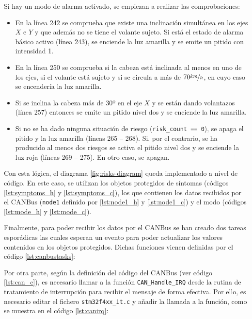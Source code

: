 Si hay un modo de alarma activado, se empiezan a realizar las comprobaciones:
\begin{itemize}
  \item En la línea 242 se comprueba que existe una inclinación simultánea en los ejes $X$
        e $Y$ y que además no se tiene el volante sujeto. Si está el estado de alarma
        básico activo (línea 243), se enciende la luz amarilla y se emite un pitido con
        intensidad 1.
  \item En la línea 250 se comprueba si la cabeza está inclinada al menos en uno de los ejes,
        si el volante está sujeto y si se circula a más de $70 \nicefrac{km}{h}$, en cuyo
        caso se encendería la luz amarilla.
  \item Si se inclina la cabeza más de 30º en el eje $X$ y se están dando volantazos (línea
        257) entonces se emite un pitido nivel dos y se enciende la luz amarilla.
  \item Si no se ha dado ninguna situación de riesgo (\texttt{risk\_count == 0}), se
        apaga el pitido y la luz amarilla (líneas 265 -- 268). Si, por el contrario, se
        ha producido al menos dos riesgos se activa el pitido nivel dos y se enciende
        la luz roja (líneas 269 -- 275). En otro caso, se apagan.
\end{itemize}

Con esta lógica, el diagrama \ref{fig:risks-diagram} queda implementado a nivel de código.
En este caso, se utilizan los objetos protegidos de síntomas (códigos \ref{lst:symptoms_h}
y \ref{lst:symptoms_c}), los que contienen los datos recibidos por el CANBus (\texttt{node1}
definido por \ref{lst:node1_h} y \ref{lst:node1_c}) y el modo (códigos \ref{lst:mode_h} y
\ref{lst:mode_c}).

Finalmente, para poder recibir los datos por el CANBus se han creado dos tareas esporádicas
las cuales esperan un evento para poder actualizar los valores contenidos en los objetos
protegidos. Dichas funciones vienen definidas por el código \ref{lst:canbustasks}:



Por otra parte, según la definición del código del CANBus (ver código \ref{lst:can_c}),
es necesario llamar a la función \texttt{CAN\_Handle\_IRQ} desde la rutina de 
tratamiento de interrupción para recibir el mensaje de forma efectiva. Por ello, es
necesario editar el fichero \texttt{stm32f4xx\_it.c} y añadir la llamada a la
función, como se muestra en el código \ref{lst:canirq}:

